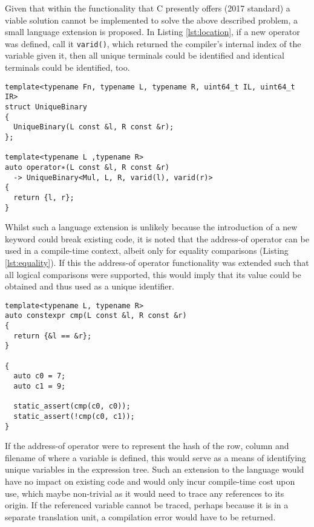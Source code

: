 \documentclass[a4paper,10pt]{article}
\def\CC{{C\nolinebreak[4]\hspace{-.05em}\raisebox{.4ex}{\tiny\bf ++}}}
\begin{document}
Given that within the functionality that {\CC} presently offers (2017 standard) a viable solution cannot
be implemented to solve the above described problem, a small language extension is proposed. In Listing \ref{lst:location}, if a new
operator was defined, call it \texttt{varid()}, which returned the compiler’s internal index of the variable given it, then all
unique terminals could be identified and identical terminals could be identified, too.


\begin{lstlisting}[caption={A possible language extension of \texttt{varid()}, returning the internal index for a given variable.}, label=lst:location]
template<typename Fn, typename L, typename R, uint64_t IL, uint64_t IR>
struct UniqueBinary
{
  UniqueBinary(L const &l, R const &r);
};

template<typename L ,typename R>
auto operator∗(L const &l, R const &r)
  -> UniqueBinary<Mul, L, R, varid(l), varid(r)>
{
  return {l, r};
}
\end{lstlisting}


Whilst such a language extension is unlikely because the introduction of a new keyword could break existing code, it is noted that the address-of operator can be used in a compile-time context, albeit only for equality comparisons (Listing \ref{lst:equality}). If this the address-of operator functionality was extended such that all logical comparisons were supported, this would imply that its value could be obtained and thus used as a unique identifier.


\begin{lstlisting}[caption={Only equality operators (\texttt{==} and \texttt{!=}) can be used at compile-time, presently.}, label=lst:equality]
template<typename L, typename R>
auto constexpr cmp(L const &l, R const &r)
{
  return {&l == &r};
}

{
  auto c0 = 7;
  auto c1 = 9;

  static_assert(cmp(c0, c0));
  static_assert(!cmp(c0, c1));
}
\end{lstlisting}


If the address-of operator were to represent the hash of the row, column and filename of where a variable is defined, this would serve as a means of identifying unique variables in the expression tree. Such an extension to the language would have no impact on existing code and would only incur compile-time cost upon use, which maybe non-trivial as it would need to trace any references to its origin. If the referenced variable cannot be traced, perhaps because it is in a separate translation unit, a compilation error would have to be returned.
\end{document}
